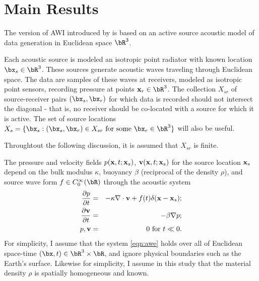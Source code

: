 \section{Main Results}

The version of AWI introduced by \cite{Warner:16} is based on an
active source acoustic model of data generation in Euclidean space
$\bR^3$. 

Each acoustic source is modeled an isotropic point radiator
with known location $\bx_s\in \bR^3$. These
sources generate acoustic waves traveling through Euclidean space. The
data are samples of these waves at receivers, modeled as isotropic
point sensors, recording pressure at points
${\bf x}_r \in \bR^3$. The collection $X_{sr}$ of source-receiver pairs
$(\bx_s,\bx_r)$ for which data is recorded should not intersect the
diagonal - that is, no receiver should be co-located with a source for
which it is active. The set of source locations $X_s = \{\bx_s: (\bx_s,\bx_r) \in X_{sr}
\mbox{ for some } \bx_r \in \bR^3\}$ will also be useful.

Throughtout the following discussion, it is assumed that
$X_{sr}$ is finite. 
  
The pressure and velocity fields $p({\bf x},t;{\bf x}_s)$,
${\bf v}({\bf x},t;{\bf x}_s)$ for the source location ${\bf x}_s$
depend on the bulk modulus $\kappa$, buoyancy $\beta$
(reciprocal of the density $\rho$), and source wave
form $f \in C_0^{\infty}(\bR)$ through the acoustic system
\begin{eqnarray}
  \label{eqn:awe}
 \frac{\partial p}{\partial t} & = &- \kappa \nabla \cdot {\bf v} +
                                    f(t) \delta({\bf x}-{\bf x}_s); \nonumber \\
\frac{\partial {\bf v}}{\partial t} & = & - \beta \nabla p; \\ 
p, {\bf v} & = & 0 \mbox{ for }  t \ll 0.
\end{eqnarray}
For simplicity, I assume that the system \ref{eqn:awe} holds over all of Euclidean
space-time $(\bx,t) \in \bR^3 \times \bR$, and ignore physical
boundaries such as the Earth's surface. Likewise for simplicity, I
assume in this study that the material density $\rho$ is spatially
homogeneous and known.

